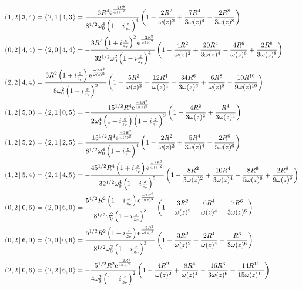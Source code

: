 \documentclass[11pt]{amsart}
\makeatletter
\newcommand{\e}{{\rm e}}				%
\newcommand{\msp}[1]{\mspace{#1mu}}		%
\newcommand{\0}{\varnothing}		%
\newcommand{\brac}[2]{\left\langle\msp{2} #1\left\lvert \msp{3.5} #2 \right.\right\rangle}	%
\newcommand{\1}{!}
\newcommand{\2}{@}
\newcommand{\3}{\#}
\newcommand{\4}{\$}
\newcommand{\5}{\%}
\newcommand{\6}{$^\wedge$}
\newcommand{\7}{\&}
\newcommand{\8}{*}
\newcommand{\9}{(}
\makeatother
\begin{document}
\begin{align*}
&
\brac{1,2}{3,4} = \brac{2,1}{4,3}=\frac{3R^4\e^{\frac{-2R^2}{\omega(z)^2}}}{8^{1/2}\omega_0^4\left(1-i\frac{z}{z_r}\right)^4}\left(1-\frac{2R^2}{\omega(z)^2}+\frac{7R^4}{3\omega(z)^4}-\frac{2R^8}{3\omega(z)^8}\right)
\\
&
\brac{0,2}{4,4}=\brac{2,0}{4,4} = -\frac{3R^2\left(1+i\frac{z}{z_r}\right)^2\e^{\frac{-2R^2}{\omega(z)^2}}}{32^{1/2}\omega_0^2\left(1-i\frac{z}{z_r}\right)^4}\left(1-\frac{4R^2}{\omega(z)^2}+\frac{20R^4}{3\omega(z)^4}-\frac{4R^6}{\omega(z)^6}+\frac{2R^8}{3\omega(z)^8}\right)
\\
&
\brac{2,2}{4,4} = \frac{3R^2\left(1+i\frac{z}{z_r}\right)\e^{\frac{-2R^2}{\omega(z)^2}}}{8\omega_0^2\left(1-i\frac{z}{z_r}\right)^3}\left(1-\frac{5R^2}{\omega(z)^2}+\frac{12R^4}{\omega(z)^4}-\frac{34R^6}{3\omega(z)^6}+\frac{6R^8}{\omega(z)^8}-\frac{10R^{10}}{9\omega(z)^{10}}\right)
\\
&
\brac{1,2}{5,0} = \brac{2,1}{0,5} = -\frac{15^{1/2}R^4\e^{\frac{-2R^2}{\omega(z)^2}}}{2\omega_0^4\left(1+i\frac{z}{z_r}\right)\left(1-i\frac{z}{z_r}\right)^3}\left(1-\frac{4R^2}{3\omega(z)^2}+\frac{R^4}{3\omega(z)^4}\right)
\\
&
\brac{1,2}{5,2} = \brac{2,1}{2,5} = \frac{15^{1/2}R^4\e^{\frac{-2R^2}{\omega(z)^2}}}{8^{1/2}\omega_0^4\left(1-i\frac{z}{z_r}\right)^4}\left(1-\frac{2R^2}{\omega(z)^2}+\frac{5R^4}{3\omega(z)^4}-\frac{2R^6}{5\omega(z)^6}\right)
\\
&
\brac{1,2}{5,4} = \brac{2,1}{4,5}= -\frac{45^{1/2}R^4\left(1+i\frac{z}{z_r}\right)\e^{\frac{-2R^2}{\omega(z)^2}}}{32^{1/2}\omega_0^4\left(1-i\frac{z}{z_r}\right)^5}\left(1-\frac{8R^2}{3\omega(z)^2}+\frac{10R^4}{3\omega(z)^4}-\frac{8R^6}{5\omega(z)^6}+\frac{2R^8}{9\omega(z)^8}\right)
\\
&
\brac{0,2}{0,6} = \brac{2,0}{6,0} =\frac{5^{1/2}R^2\left(1+i\frac{z}{z_r}\right)\e^{\frac{-2R^2}{\omega(z)^2}}}{8^{1/2}\omega_0^2\left(1-i\frac{z}{z_r}\right)^3}\left(1-\frac{3R^2}{\omega(z)^2}+\frac{6R^4}{\omega(z)^4}-\frac{7R^6}{3\omega(z)^6}\right)
\\
&
\brac{0,2}{6,0} = \brac{2,0}{0,6} = \frac{5^{1/2}R^2\left(1+i\frac{z}{z_r}\right)\e^{\frac{-2R^2}{\omega(z)^2}}}{8^{1/2}\omega_0^2\left(1-i\frac{z}{z_r}\right)^3}\left(1-\frac{3R^2}{\omega(z)^2}+\frac{2R^4}{\omega(z)^4}-\frac{R^6}{3\omega(z)^6}\right)
\\
&
\brac{2,2}{0,6} = \brac{2,2}{6,0} =-\frac{5^{1/2}R^2\e^{\frac{-2R^2}{\omega(z)^2}}}{4\omega_0^2\left(1-i\frac{z}{z_r}\right)^2}\left(1-\frac{4R^2}{\omega(z)^2}+\frac{8R^4}{\omega(z)^4}-\frac{16R^6}{3\omega(z)^6}+\frac{14R^{10}}{15\omega(z)^{10}}\right)

\end{align*}
\end{document}
